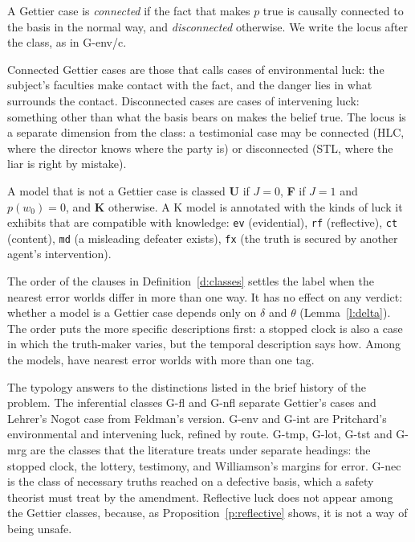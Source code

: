 \documentclass{situationist-preprint}
\begin{document}
\begin{definition}[Locus]\label{d:locus}
A Gettier case is \emph{connected} if the fact that makes $p$ true is causally connected to the basis in the normal way, and \emph{disconnected} otherwise. We write the locus after the class, as in G-env/c.
\end{definition}

Connected Gettier cases are those that \citet{Pritchard2012} calls cases of environmental luck: the subject's faculties make contact with the fact, and the danger lies in what surrounds the contact. Disconnected cases are cases of intervening luck: something other than what the basis bears on makes the belief true. The locus is a separate dimension from the class: a testimonial case may be connected (HLC, where the director knows where the party is) or disconnected (STL, where the liar is right by mistake).

\begin{definition}\label{d:other}
A model that is not a Gettier case is classed \textbf{U} if $J = 0$, \textbf{F} if $J = 1$ and $p(w_0) = 0$, and \textbf{K} otherwise. A K model is annotated with the kinds of luck it exhibits that are compatible with knowledge: \texttt{ev} (evidential), \texttt{rf} (reflective), \texttt{ct} (content), \texttt{md} (a misleading defeater exists), \texttt{fx} (the truth is secured by another agent's intervention).
\end{definition}

\begin{remark}\label{r:priority}
The order of the clauses in Definition~\ref{d:classes} settles the label when the nearest error worlds differ in more than one way. It has no effect on any verdict: whether a model is a Gettier case depends only on $\delta$ and $\theta$ (Lemma~\ref{l:delta}). The order puts the more specific descriptions first: a stopped clock is also a case in which the truth-maker varies, but the temporal description says how. Among the \stnmodels{} models, \stnmulti{} have nearest error worlds with more than one tag.
\end{remark}

The typology answers to the distinctions listed in the brief history of the problem. The inferential classes G-fl and G-nfl separate Gettier's cases and Lehrer's Nogot case from Feldman's version. G-env and G-int are Pritchard's environmental and intervening luck, refined by route. G-tmp, G-lot, G-tst and G-mrg are the classes that the literature treats under separate headings: the stopped clock, the lottery, testimony, and Williamson's margins for error. G-nec is the class of necessary truths reached on a defective basis, which a safety theorist must treat by the amendment. Reflective luck does not appear among the Gettier classes, because, as Proposition~\ref{p:reflective} shows, it is not a way of being unsafe.
\end{document}
